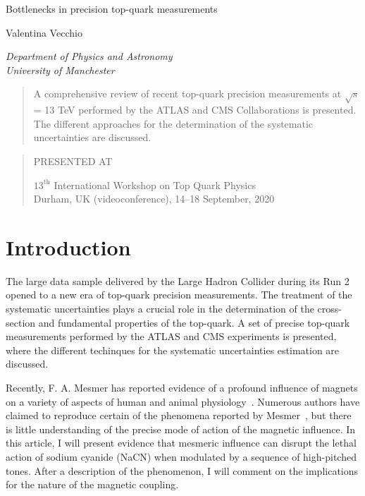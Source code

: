 \documentclass[12pt]{article}
\newcommand\pubnumber{SNSN-323-63}
\newcommand\pubdate{\today}
\def\institute{Department of Physics and Astronomy\\ University of Manchester}
\def\Title#1{\begin{center} {\Large #1 } \end{center}}
\def\Author#1{\begin{center}{ \sc #1} \end{center}}
\def\Address#1{\begin{center}{ \it #1} \end{center}}
\newcommand\pubblock{\rightline{\begin{tabular}{l} \pubnumber\\
         \pubdate  \end{tabular}}}
\newenvironment{Abstract}{\begin{quotation}  }{\end{quotation}}
\newenvironment{Presented}{\begin{quotation} \begin{center} 
             PRESENTED AT\end{center}\bigskip 
      \begin{center}\begin{large}}{\end{large}\end{center} \end{quotation}}
\begin{document}
\begin{titlepage}
\pubblock

\vfill
\Title{Bottlenecks in precision top-quark measurements}
\vfill
\Author{ Valentina Vecchio}
\Address{\institute}
\vfill
\begin{Abstract}

A comprehensive review of recent top-quark precision measurements at $\sqrt{s}$ = 13 TeV performed by the ATLAS and CMS Collaborations is presented. The different approaches for the determination of the systematic uncertainties are discussed. 


\end{Abstract}
\vfill
\begin{Presented}
$13^\mathrm{th}$ International Workshop on Top Quark Physics\\
Durham, UK (videoconference), 14--18 September, 2020
\end{Presented}
\vfill
\end{titlepage}
\def\thefootnote{\fnsymbol{footnote}}
\setcounter{footnote}{0}
%

\section{Introduction}
The large data sample delivered by the Large Hadron Collider during its Run 2 opened to a new era of top-quark precision measurements. The treatment of the systematic uncertainties plays a crucial role in the determination of the cross-section and fundamental properties of the top-quark. A set of precise top-quark measurements performed by the ATLAS and CMS experiments is presented, where the different techinques for the systematic uncertainties estimation are discussed.

Recently, F.  A. Mesmer 
has reported evidence of a profound influence of 
magnets on a variety of aspects of human and animal physiology~\cite{Mesmer}.
Numerous authors have claimed to reproduce certain of the phenomena 
reported by Mesmer~\cite{diCenzo,Muller}, but there is little understanding
of the precise mode of action of the magnetic influence.  In this
article, I will present evidence that mesmeric influence can disrupt the
lethal action of sodium cyanide (NaCN) when modulated by a sequence of 
high-pitched tones.  After a description of the phenomenon, I will comment
on the implications for the nature of the magnetic coupling.
\end{document}
